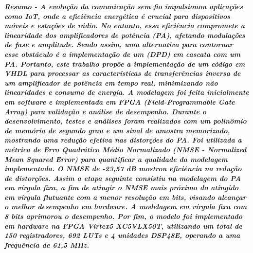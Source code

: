 \documentclass[twocolumn, a4paper]{article}
\begin{document}
\begin{strip}
  \vspace*{\dimexpr-\baselineskip-\stripsep\relax}
   \maketitle
  \vskip\baselineskip
\noindent %
  \vskip\baselineskip
\end{strip}
\thispagestyle{specialfooter}
\vspace{3pt}\textbf{\textit{Resumo - A evolução da comunicação sem fio impulsionou aplicações como IoT, onde a eficiência energética é crucial para dispositivos móveis e estações de rádio. No entanto, essa eficiência compromete a linearidade dos amplificadores de potência (PA), afetando modulações de fase e amplitude. Sendo assim, uma alternativa para contornar esse obstáculo é a implementação de um (DPD) em cascata com um PA. Portanto, este trabalho propõe a implementação de um código em VHDL para processar as características de transferências inversa de um amplificador de potência em tempo real, minimizando não linearidades e consumo de energia. A modelagem foi feita inicialmente em software e implementada em FPGA (Field-Programmable Gate Array) para validação e análise de desempenho. Durante o desenvolvimento, testes e análises foram realizados com um polinômio de memória de segundo grau e um sinal de amostra memorizado, mostrando uma redução efetiva nas distorções do PA. Foi utilizada a métrica de Erro Quadrático Médio Normalizado (NMSE - Normalized Mean Squared Error) para quantificar a qualidade da modelagem implementada. O NMSE de -23,57 dB mostrou eficiência na redução de distorções. Assim a etapa seguinte consistiu na modelagem do PA em vírgula fixa, a fim de atingir o NMSE mais próximo do atingido em vírgula flutuante com a menor resolução em bits, visando alcançar o melhor desempenho em hardware. A modelagem em vírgula fixa com 8 bits aprimorou o desempenho. Por fim, o modelo foi implementado em hardware na FPGA Virtex5 XC5VLX50T, utilizando um total de 150 registradores, 692 LUTs e 4 unidades DSP48E, operando a uma frequência de 61,5 MHz.}}
\end{document}
